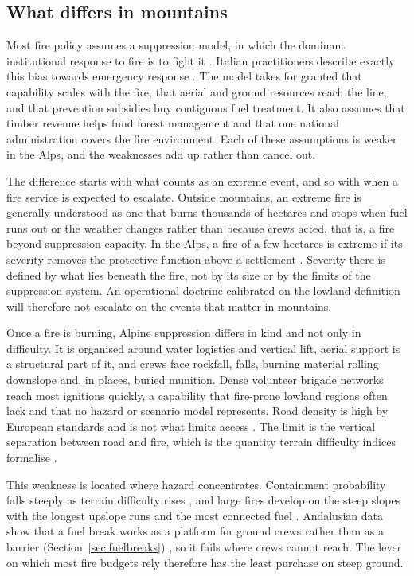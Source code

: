 \documentclass[11pt,a4paper]{article}
\begin{document}
\subsection{What differs in mountains}

Most fire policy assumes a suppression model, in which the dominant institutional response to fire is to fight it \citep{moritz_learning_2014}. Italian practitioners describe exactly this bias towards emergency response \citep{kirschner_governance_2024}. The model takes for granted that capability scales with the fire, that aerial and ground resources reach the line, and that prevention subsidies buy contiguous fuel treatment. It also assumes that timber revenue helps fund forest management and that one national administration covers the fire environment. Each of these assumptions is weaker in the Alps, and the weaknesses add up rather than cancel out.

The difference starts with what counts as an extreme event, and so with when a fire service is expected to escalate. Outside mountains, an extreme fire is generally understood as one that burns thousands of hectares and stops when fuel runs out or the weather changes rather than because crews acted, that is, a fire beyond suppression capacity. In the Alps, a fire of a few hectares is extreme if its severity removes the protective function above a settlement \citep{muller_forest_2020}. Severity there is defined by what lies beneath the fire, not by its size or by the limits of the suppression system. An operational doctrine calibrated on the lowland definition will therefore not escalate on the events that matter in mountains.

Once a fire is burning, Alpine suppression differs in kind and not only in difficulty. It is organised around water logistics and vertical lift, aerial support is a structural part of it, and crews face rockfall, falls, burning material rolling downslope and, in places, buried munition. Dense volunteer brigade networks reach most ignitions quickly, a capability that fire-prone lowland regions often lack and that no hazard or scenario model represents. Road density is high by European standards and is not what limits access \citep{muller_forest_2020}. The limit is the vertical separation between road and fire, which is the quantity terrain difficulty indices formalise \citep{cardil_assessing_2025}.

This weakness is located where hazard concentrates. Containment probability falls steeply as terrain difficulty rises \citep{cardil_assessing_2025}, and large fires develop on the steep slopes with the longest upslope runs and the most connected fuel \citep{conedera_linking_2024}. Andalusian data show that a fuel break works as a platform for ground crews rather than as a barrier (Section~\ref{sec:fuelbreaks}) \citep{ortega_modeling_2024}, so it fails where crews cannot reach. The lever on which most fire budgets rely therefore has the least purchase on steep ground.
\end{document}
